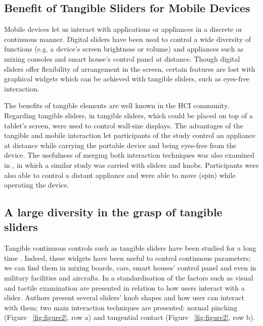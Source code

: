 \documentclass{sigchi}
\begin{document}
\subsection{Benefit of Tangible Sliders for Mobile Devices}
Mobile devices let us interact with applications or appliances in a discrete or continuous manner. Digital sliders have been used to control a wide diversity of functions (e.g. a device’s screen brightness or volume) and appliances such as mixing consoles and smart house’s control panel at distance. Though digital sliders offer flexibility of arrangement in the screen, certain features are lost with graphical widgets which can be achieved with tangible sliders, such as eyes-free interaction.

The benefits of tangible elements are well known in the HCI community. Regarding tangible sliders, in \cite{Jansen:2012:TRC:2207676.2208691} tangible sliders, which could be placed on top of a tablet’s screen, were used to control wall-size displays. The advantages of the tangible and mobile interaction let participants of the study control an appliance at distance while carrying the portable device and being eyes-free from the device. The usefulness of merging both interaction techniques was also examined in \cite{unpublished}, in which a similar study was carried with sliders and knobs. Participants were also able to control a distant appliance and were able to move (spin) while operating the device.

\subsection{A large diversity in the grasp of tangible sliders}
Tangible continuous controls such as tangible sliders have been studied for a long time \cite{Kroemer}. Indeed, these widgets have been useful to control continuous parameters; we can find them in mixing boards, cars, smart houses’ control panel and even in military facilities and aircrafts. 
In \cite{standrs} a standardisation of the factors such as visual and tactile examination are presented in relation to how users interact with a slider. Authors present several sliders’ knob shapes and how user can interact with them; two main interaction techniques are presented: normal pinching (Figure ~\ref{fig:figure2}, row a) and tangential contact (Figure ~\ref{fig:figure2}, row b).
\end{document}
